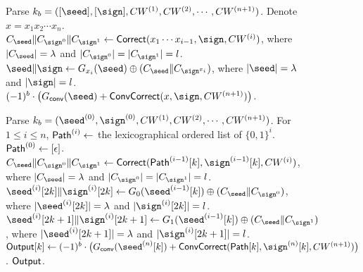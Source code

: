 \begin{figure*}
{{\begin{algorithmic}[1]
      \State Parse $k_b = ([\seed],[\sign],CW^{(1)},CW^{(2)},\cdots,CW^{(n+1)})$. 
      \State Denote $x=x_1x_2\cdots x_n$. 
        \State $C_\seed\|C_{\sign^0}\|C_{\sign^1}\gets {\sf Correct}(x_1\cdots x_{i-1},\sign,CW^{(i)})$, where $|C_\seed| = \lambda$ and $|C_{\sign^0}| = |C_{\sign^1}| = l$. \label{alg:paradigm_correction}
        \State $\seed\|\sign\gets G_{x_i}(\seed)\oplus(C_{\seed}\|C_{\sign^{x_i}})$, where $|\seed|=\lambda$ and $|\sign|=l$. \label{alg:paradigm_seed_sign}
      \EndFor
      \State \Return $(-1)^b\cdot \big(G_{\sf conv}(\seed)+{\sf ConvCorrect}(x,\sign,CW^{(n+1)})\big)$. \label{alg:paradigm_convert_correction}
      \EndProcedure
      \item[]
      \State Parse $k_b=(\seed^{(0)},\sign^{(0)},CW^{(1)},CW^{(2)},\cdots,CW^{(n+1)})$. 
      \State For $1\le i\le n$, ${\sf Path}^{(i)}\gets$ the lexicographical ordered list of $\{0,1\}^i$. ${\sf Path}^{(0)}\gets[\epsilon]$. 
      \State{}
          \State $C_\seed\|C_{\sign^0}\|C_{\sign^1}\gets {\sf Correct}({\sf Path}^{(i-1)}[k],\sign^{(i-1)}[k],CW^{(i)})$, where $|C_\seed| = \lambda$ and $|C_{\sign^0}| = |C_{\sign^1}| = l$. 
          \State $\seed^{(i)}[2k]\|\sign^{(i)}[2k]\gets G_0(\seed^{(i-1)}[k])\oplus (C_\seed\|C_{\sign^0})$, where $|\seed^{(i)}[2k]|=\lambda$ and $|\sign^{(i)}[2k]|=l$. 
          \State $\seed^{(i)}[2k+1]\|\sign^{(i)}[2k+1]\gets G_1(\seed^{(i-1)}[k])\oplus (C_\seed\|C_{\sign^1})$, where $|\seed^{(i)}[2k+1]|=\lambda$ and $|\sign^{(i)}[2k+1]|=l$. 
        \EndFor
      \EndFor
        \State ${\sf Output}[k]\gets (-1)^b\cdot \big(G_{\sf conv}(\seed^{(n)}[k])+{\sf ConvCorrect}({\sf Path}[k],\sign^{(n)}[k],CW^{(n+1)})\big)$.
      \EndFor
      \State\Return $\sf Output$. 
      \EndProcedure
      \end{algorithmic}}}
  \end{figure*}


